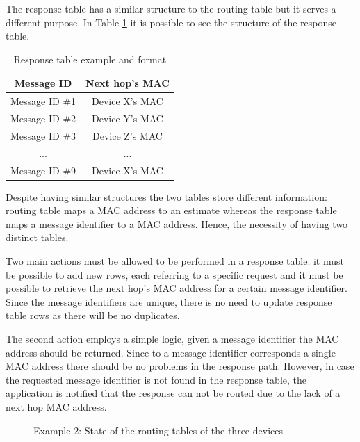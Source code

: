 The response table has a similar structure to the routing table but it serves a different purpose. In Table \ref{tab:rspTables} it is possible to see the structure of the response table.

\begin{table}[ht]
\centering
\bgroup
\def\arraystretch{2.5}
\begin{tabular}{|c|c|}
\hline
\textbf{Message ID} & \textbf{Next hop's MAC} \\ \hline
Message ID \#1 & Device X's MAC \\ \hline
Message ID \#2 & Device Y's MAC \\ \hline
Message ID \#3 & Device Z's MAC \\ \hline
... & ... \\ \hline
Message ID \#9 & Device X's MAC \\ \hline
\end{tabular}
\egroup
\caption{Response table example and format}
\label{tab:rspTables}
\end{table}

Despite having similar structures the two tables store different information: routing table maps a \gls{MAC} address to an estimate whereas the response table maps a message identifier to a \gls{MAC} address. Hence, the necessity of having two distinct tables.

Two main actions must be allowed to be performed in a response table: it must be possible to add new rows, each referring to a specific request and it must be possible to retrieve the next hop's \gls{MAC} address for a certain message identifier. Since the message identifiers are unique, there is no need to update response table rows as there will be no duplicates.

The second action employs a simple logic, given a message identifier the \gls{MAC} address should be returned. Since to a message identifier corresponds a single \gls{MAC} address there should be no problems in the response path. However, in case the requested message identifier is not found in the response table, the application is notified that the response can not be routed due to the lack of a next hop \gls{MAC} address.


\begin{figure}[ht]
   \noindent{}
	\caption{\label{fig:example1.0} Example 2: State of the routing tables of the three devices}
\end{figure}

